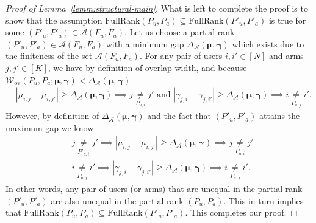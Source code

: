\documentclass{article}
\begin{document}
\begin{proof}[Proof of Lemma~\ref{lemm:structural-main}]
What is left to complete the proof is to show that the assumption $\mathrm{FullRank}(P_u, P_a) \subseteq \mathrm{FullRank}(P'_u, P'_a)$ is true for some $(P'_u, P'_a) \in \mathcal{A}(F_u, F_a)$. Let us choose a partial rank $(P'_u, P'_a) \in \mathcal{A}(F_u, F_a)$ with a minimum gap $\Delta_{\mathcal{A}}(\boldsymbol{\mu}, \boldsymbol{\gamma})$ which exists due to the finiteness of the set $\mathcal{A}(F_u, F_a)$. For any pair of users $i, i' \in [N]$ and arms $j, j' \in [K]$, we have by definition of overlap width, and because 
$\mathcal{W}_{\mathrm{ov}}(P_u, P_a; \boldsymbol{\mu}, \boldsymbol{\gamma}) < \Delta_{\mathcal{A}}(\boldsymbol{\mu}, \boldsymbol{\gamma})$
\begin{align*}
    &|\mu_{i,j} - \mu_{i, j'}| \geq  \Delta_{\mathcal{A}}(\boldsymbol{\mu}, \boldsymbol{\gamma}) \implies j \underset{P_{u,i}}{\neq} j' \text{ and }
    |\gamma_{j,i} - \gamma_{j,i'}| \geq  \Delta_{\mathcal{A}}(\boldsymbol{\mu}, \boldsymbol{\gamma}) \implies i \underset{P_{a,j}}{\neq} i'.
\end{align*}
However, by definition of $\Delta_{\mathcal{A}}(\boldsymbol{\mu}, \boldsymbol{\gamma})$ and the fact that $(P'_u, P'_a)$ attains the maximum gap we know
\begin{align*}
    &j \underset{P'_{u,i}}{\neq} j' \implies |\mu_{i,j} - \mu_{i, j'}| \geq  \Delta_{\mathcal{A}}(\boldsymbol{\mu}, \boldsymbol{\gamma}) \implies j \underset{P_{u,i}}{\neq} j' \\
     &i \underset{P_{a,j}}{\neq} i' \implies  |\gamma_{j,i} - \gamma_{j,i'}| \geq  \Delta_{\mathcal{A}}(\boldsymbol{\mu}, \boldsymbol{\gamma}) \implies i \underset{P_{a,j}}{\neq} i'.
\end{align*}
In other words, any pair of users (or arms) that are unequal in the partial rank $(P'_u, P'_a)$ are also unequal in the partial rank $(P_u, P_a)$. This in turn implies that $\mathrm{FullRank}(P_u, P_a) \subseteq \mathrm{FullRank}(P'_u, P'_a)$. This completes our proof.
\end{proof}


\end{document}

